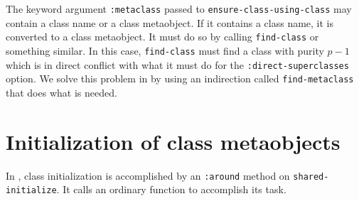 The keyword argument \texttt{:metaclass} passed to
\texttt{ensure-class-using-class} may contain a class name or a class
metaobject.  If it contains a class name, it is converted to a class
metaobject.  It must do so by calling \texttt{find-class} or something
similar.  In this case, \texttt{find-class} must find a class with
purity $p-1$ which is in direct conflict with what it must do for the
\texttt{:direct-superclasses} option.  We solve this problem in
\sysname{} by using an indirection called \texttt{find-metaclass} that
does what is needed.

\section{Initialization of class metaobjects}

In \sysname{}, class initialization is accomplished by an
\texttt{:around} method on \texttt{shared-initialize}.  It calls an
ordinary function to accomplish its task.
